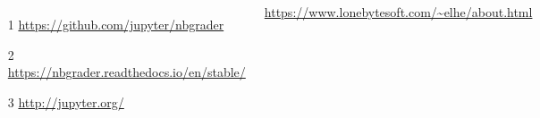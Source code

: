 \documentclass[25pt, 
               a0paper, 
               portraitmargin = 0mm, 
               margin = 0mm,
               innermargin = 50mm,
               blockverticalspace = 1mm,
               colspace = 40mm,
               subcolspace = 8mm]
               {tikzposter}
\begin{document}
\begin{columns}
	{
	\begin{itemize}
	\item[1] \url{https://github.com/jupyter/nbgrader}
	\item[2] \url{https://nbgrader.readthedocs.io/en/stable/}
	\item[3] \url{http://jupyter.org/}
	\end{itemize}
	
 	}
    
    
    {
    	\url{https://www.lonebytesoft.com/~elhe/about.html}\\
    	\begin{center}
    	\includegraphics[width=0.5\linewidth]{images/QR.png}
    	\end{center}
    }         
    
   
\end{columns}


\block{}
{
}

 
\end{document}

